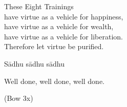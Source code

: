 \begin{english-verses}
  These Eight Trainings\\
  have virtue as a vehicle for happiness,\\
  have virtue as a vehicle for wealth,\\
  have virtue as a vehicle for liberation.\\
  Therefore let virtue be purified.\ifdigital\makeatletter\hyperlink{endnote144-appendix}\makeatother\fi
\end{english-verses}

Sādhu sādhu sādhu

\begin{english}
  Well done, well done, well done.
\end{english}

\begin{center}
  (Bow 3x)
\end{center}

\clearpage


